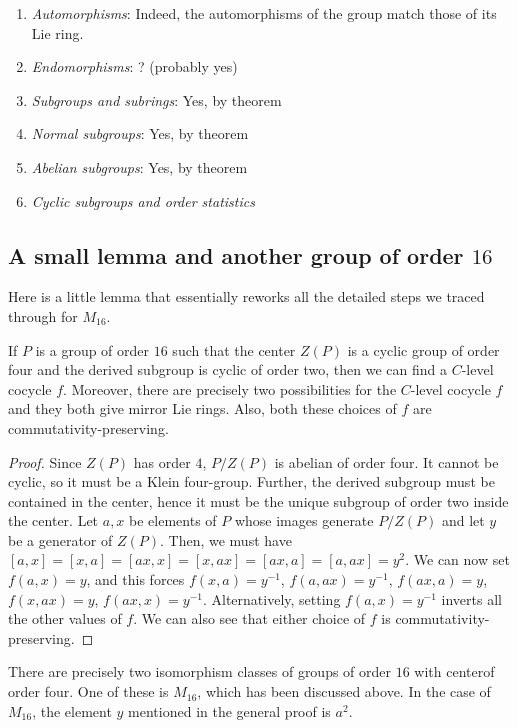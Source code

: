 \documentclass[10pt]{amsart}
\begin{document}
\begin{enumerate}
\item {\em Automorphisms}: Indeed, the automorphisms of the group
  match those of its Lie ring.
\item {\em Endomorphisms}: ? (probably yes)
\item {\em Subgroups and subrings}: Yes, by theorem
\item {\em Normal subgroups}: Yes, by theorem
\item {\em Abelian subgroups}: Yes, by theorem
\item {\em Cyclic subgroups and order statistics}
\end{enumerate}

\subsection{A small lemma and another group of order $16$}

Here is a little lemma that essentially reworks all the detailed steps
we traced through for $M_{16}$.

\begin{lemma}
  If $P$ is a group of order $16$ such that the center $Z(P)$ is a
  cyclic group of order four and the derived subgroup is cyclic of
  order two, then we can find a $C$-level cocycle $f$. Moreover, there
  are precisely two possibilities for the $C$-level cocycle $f$ and
  they both give mirror Lie rings. Also, both these choices of $f$ are
  commutativity-preserving.
\end{lemma}

\begin{proof}
  Since $Z(P)$ has order $4$, $P/Z(P)$ is abelian of order four. It
  cannot be cyclic, so it must be a Klein four-group. Further, the
  derived subgroup must be contained in the center, hence it must be
  the unique subgroup of order two inside the center. Let $a,x$ be
  elements of $P$ whose images generate $P/Z(P)$ and let $y$ be a
  generator of $Z(P)$. Then, we must have $[a,x] = [x,a] = [ax,x] =
  [x,ax] = [ax,a] = [a,ax] = y^2$. We can now set $f(a,x) = y$, and
  this forces $f(x,a) = y^{-1}$, $f(a,ax) = y^{-1}$, $f(ax,a) = y$,
  $f(x,ax) = y$, $f(ax,x) = y^{-1}$. Alternatively, setting $f(a,x) =
  y^{-1}$ inverts all the other values of $f$. We can also see that
  either choice of $f$ is commutativity-preserving.
\end{proof}

There are precisely two isomorphism classes of groups of order $16$
with centerof order four. One of these is $M_{16}$, which has been
discussed above. In the case of $M_{16}$, the element $y$ mentioned in
the general proof is $a^2$. 
\end{document}
